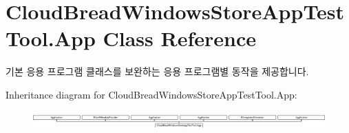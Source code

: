 \hypertarget{class_cloud_bread_windows_store_app_test_tool_1_1_app}{}\section{Cloud\+Bread\+Windows\+Store\+App\+Test\+Tool.\+App Class Reference}
\label{class_cloud_bread_windows_store_app_test_tool_1_1_app}


기본 응용 프로그램 클래스를 보완하는 응용 프로그램별 동작을 제공합니다.  


Inheritance diagram for Cloud\+Bread\+Windows\+Store\+App\+Test\+Tool.\+App\+:\begin{figure}[H]
\begin{center}
\leavevmode
\includegraphics[height=0.707071cm]{class_cloud_bread_windows_store_app_test_tool_1_1_app}
\end{center}
\end{figure}
